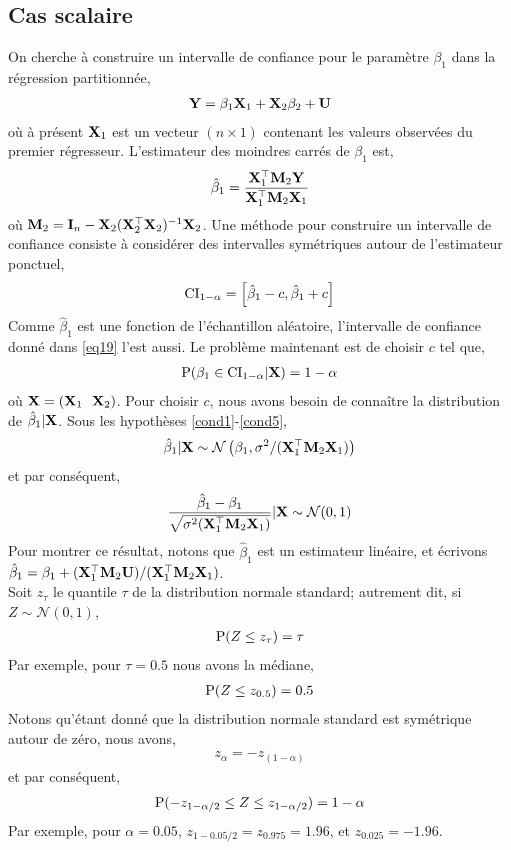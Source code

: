 \subsection{Cas scalaire}
On cherche à construire un intervalle de confiance pour le paramètre $\beta_1$ dans la régression partitionnée,
\begin{align*}
\mathbf Y = \beta_1\mathbf X_1+\mathbf X_2\beta_2 + \mathbf U
\end{align*}
où à présent $\mathbf X_1$ est un vecteur $(n\times 1)$ contenant les valeurs observées du premier régresseur. L'estimateur des moindres carrés de $\beta_1$ est,
\begin{align*}
\hat{\beta}_1 = \frac{\mathbf X_1^\top\mathbf M_2\mathbf Y}{\mathbf X_1^\top\mathbf M_2\mathbf X_1}
\end{align*}
où $\mathbf M_2 = \mathbf{I}_n - \mathbf X_2(\mathbf X_2^\top\mathbf X_2)^{-1}\mathbf X_2$. Une méthode pour construire un intervalle de confiance consiste à considérer des intervalles symétriques autour de l'estimateur ponctuel,
\begin{align}
\mathrm{CI}_{1-\alpha} = \left[\hat{\beta}_1- c,  \hat{\beta}_1+c\right]
\label{eq19}
\end{align}
Comme $\hat{\beta}_1$ est une fonction de l'échantillon aléatoire, l'intervalle de confiance donné dans \eqref{eq19} l'est aussi. Le problème maintenant est de choisir $c$ tel que,
\begin{align*}
\operatorname{P}(\beta_1 \in \mathrm{CI}_{1-\alpha}| \mathbf X) = 1-\alpha
\end{align*}
où $\mathbf X = (\mathbf X_1 \ \ \mathbf X_2)$. Pour choisir $c$, nous avons besoin de connaître la distribution de $\hat{\beta}_1|\mathbf X$. Sous les hypothèses \ref{cond1}-\ref{cond5},
\begin{align*}
\hat{\beta}_1|\mathbf X \sim \mathcal{N}\left(\beta_1, \sigma^2/(\mathbf X_1^\top\mathbf M_2\mathbf X_1)\right)
\end{align*}
et par conséquent,
\begin{align}
\frac{\hat{\beta}_1-\beta_1 }{\sqrt{\sigma^2
(\mathbf X_1^\top\mathbf M_2\mathbf X_1)}} | \mathbf X \sim \mathcal{N}(0, 1)
\label{eq20}
\end{align}
Pour montrer ce résultat, notons que $\hat{\beta}_1$ est un estimateur linéaire, et écrivons $\hat{\beta}_1 = \beta_1 + (\mathbf X_1^\top\mathbf M_2\mathbf U) / (\mathbf X_1^\top\mathbf M_2\mathbf X_1)$.\\
Soit $z_\tau$ le quantile $\tau$ de la distribution normale standard; autrement dit, si $Z\sim \mathcal{N}(0,1)$,
\begin{align*}
\operatorname{P}(Z \leq z_\tau) = \tau
\end{align*}
Par exemple, pour $\tau = 0.5$ nous avons la médiane,
\begin{align*}
\operatorname{P}(Z \leq z_{0.5}) = 0.5
\end{align*}
Notons qu'étant donné que la distribution normale standard est symétrique autour de zéro, nous avons,
\begin{align*}
z_\alpha = -z_{(1-\alpha)}
\end{align*}
et par conséquent,
\begin{align*}
\operatorname{P}(-z_{1 - \alpha/2}\leq Z\leq z_{1-\alpha/2}) = 1-\alpha
\end{align*}
Par exemple, pour $\alpha=0.05$, $z_{1 - 0.05/2} = z_{0.975} = 1.96$, et $z_{0.025} = -1.96$.

